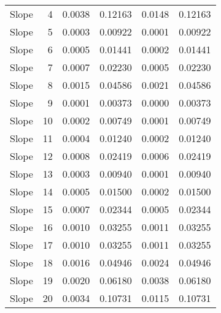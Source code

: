\begin{table}[H]
\begin{tabular}{lrrrrr}
  Slope &   4 & 0.0038 & 0.12163 & 0.0148 & 0.12163 \\ 
  Slope &   5 & 0.0003 & 0.00922 & 0.0001 & 0.00922 \\ 
  Slope &   6 & 0.0005 & 0.01441 & 0.0002 & 0.01441 \\ 
  Slope &   7 & 0.0007 & 0.02230 & 0.0005 & 0.02230 \\ 
  Slope &   8 & 0.0015 & 0.04586 & 0.0021 & 0.04586 \\ 
  Slope &   9 & 0.0001 & 0.00373 & 0.0000 & 0.00373 \\ 
  Slope &  10 & 0.0002 & 0.00749 & 0.0001 & 0.00749 \\ 
  Slope &  11 & 0.0004 & 0.01240 & 0.0002 & 0.01240 \\ 
  Slope &  12 & 0.0008 & 0.02419 & 0.0006 & 0.02419 \\ 
  Slope &  13 & 0.0003 & 0.00940 & 0.0001 & 0.00940 \\ 
  Slope &  14 & 0.0005 & 0.01500 & 0.0002 & 0.01500 \\ 
  Slope &  15 & 0.0007 & 0.02344 & 0.0005 & 0.02344 \\ 
  Slope &  16 & 0.0010 & 0.03255 & 0.0011 & 0.03255 \\ 
  Slope &  17 & 0.0010 & 0.03255 & 0.0011 & 0.03255 \\ 
  Slope &  18 & 0.0016 & 0.04946 & 0.0024 & 0.04946 \\ 
  Slope &  19 & 0.0020 & 0.06180 & 0.0038 & 0.06180 \\ 
  Slope &  20 & 0.0034 & 0.10731 & 0.0115 & 0.10731 \\ 
   \hline
\end{tabular}
\end{table}

